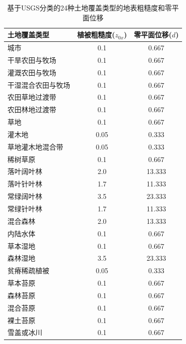 \begin{table}[]
\centering
\caption{基于USGS分类的24种土地覆盖类型的地表粗糙度和零平面位移}
\label{tab:USGS地表粗糙度和零平面位移}
\begin{tabular}{@{}lcc@{}}
\toprule
土地覆盖类型    & 植被粗糙度($z_{0x}$) & 零平面位移($d$) \\ \midrule
城市        & 0.1              & 0.667    \\
干旱农田与牧场   & 0.1              & 0.667    \\
灌溉农田与牧场   & 0.1              & 0.667    \\
干湿混合农田与牧场 & 0.1              & 0.667    \\
农田草地过渡带   & 0.1              & 0.667    \\
农田林地过渡带   & 0.1              & 0.667    \\
草地        & 0.1              & 0.667    \\
灌木地       & 0.05             & 0.333    \\
草地灌木地混合带  & 0.05             & 0.333    \\
稀树草原      & 0.1              & 0.667    \\
落叶阔叶林     & 2.0              & 13.333   \\
落叶针叶林     & 1.7              & 11.333   \\
常绿阔叶林     & 3.5              & 23.333   \\
常绿针叶林     & 1.7              & 11.333   \\
混合森林      & 2.0              & 13.333   \\
内陆水体      & 0.1              & 0.667    \\
草本湿地      & 0.1              & 0.667    \\
森林湿地      & 3.5              & 23.333   \\
贫瘠稀疏植被    & 0.05             & 0.333    \\
草本苔原      & 0.1              & 0.667    \\
森林苔原      & 0.1              & 0.667    \\
混合苔原      & 0.1              & 0.667    \\
裸土苔原      & 0.1              & 0.667    \\
雪盖或冰川     & 0.1              & 0.667    \\ \bottomrule
\end{tabular}
\end{table}

